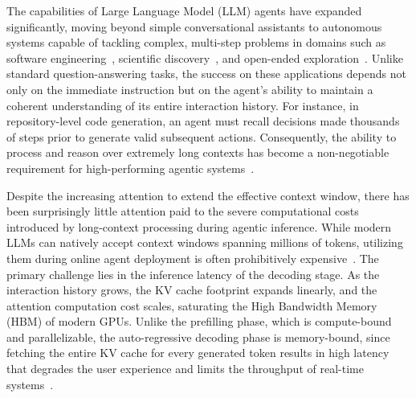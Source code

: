 The capabilities of Large Language Model (LLM) agents have expanded significantly, moving beyond simple conversational assistants to autonomous systems capable of tackling complex, multi-step problems in domains such as software engineering~\citep{jimenez2023swe}, scientific discovery~\cite{lu2024aiscientistfullyautomated}, and open-ended exploration~\cite{he2024webvoyagerbuildingendtoendweb,tongyidr}. Unlike standard question-answering tasks, the success on these applications depends not only on the immediate instruction but on the agent's ability to maintain a coherent understanding of its entire interaction history. For instance, in repository-level code generation, an agent must recall decisions made thousands of steps prior to generate valid subsequent actions. Consequently, the ability to process and reason over extremely long contexts has become a non-negotiable requirement for high-performing agentic systems~\cite{zhou2025mem1,wu2025resum,lu2025scaling,sun2025scaling,yu2025memagent}.

Despite the increasing attention to extend the effective context window, there has been surprisingly little attention paid to the severe computational costs introduced by long-context processing during agentic inference. While modern LLMs can natively accept context windows spanning millions of tokens, utilizing them during online agent deployment is often prohibitively expensive~\citep{yuan2024llm}. The primary challenge lies in the inference latency of the decoding stage. As the interaction history grows, the KV cache footprint expands linearly, and the attention computation cost scales, saturating the High Bandwidth Memory (HBM) of modern GPUs. Unlike the prefilling phase, which is compute-bound and parallelizable, the auto-regressive decoding phase is memory-bound, since fetching the entire KV cache for every generated token results in high latency that degrades the user experience and limits the throughput of real-time systems~\citep{tang2024questqueryawaresparsityefficient}.

